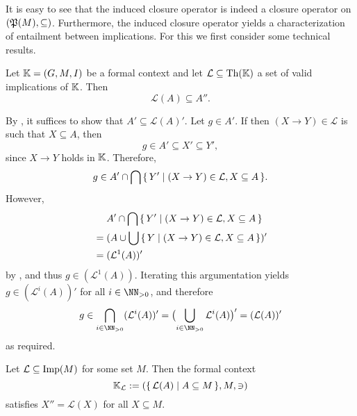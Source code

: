 It is easy to see that the induced closure operator is indeed a closure operator on
$({\mathfrak{P}(M)}, \subseteq)$.  Furthermore, the induced closure operator yields a
characterization of entailment between implications.  For this we first consider some
technical results.

\begin{Proposition}
  \label{prop:sound-implications-do-not-yield-more-then-doubleprime}
  Let ${\mathbb{K}} = (G, M, I)$ be a formal context and let $\mathcal{L} \subseteq \operatorname{Th}({\mathbb{K}})$
  a set of valid implications of ${\mathbb{K}}$.  Then
  \begin{equation*}
    \mathcal{L}(A) \subseteq A''.
  \end{equation*}
\end{Proposition}
\begin{Proof}
  By , it suffices to show that $A' \subseteq
  \mathcal{L}(A)'$.  Let $g \in A'$.  If then $(X \to Y) \in \mathcal{L}$ is such that $X
  \subseteq A$, then
  \begin{equation*}
    g \in A' \subseteq X' \subseteq Y',
  \end{equation*}
  since $X \to Y$ holds in ${\mathbb{K}}$.  Therefore,
  \begin{equation*}
    g \in A' \cap \bigcap {\ensuremath{\{\, Y' \mid (X \to Y) \in \mathcal{L}, X \subseteq A \,\}}}.
  \end{equation*}
  However,
  \begin{align*}
    & \phantom{{}={}} A' \cap \bigcap \set{ Y' \mid (X \to Y) \in \mathcal{L}, X \subseteq A} \\
    & = (A \cup \bigcup \set{ Y \mid (X \to Y) \in \mathcal{L}, X \subseteq A })'\\
    & = (\mathcal{L}^1(A))'
  \end{align*}
  by , and thus $g \in (\mathcal{L}^1(A))$.  Iterating
  this argumentation yields $g \in (\mathcal{L}^i(A))'$ for all $i \in \NN_{>0}$, and
  therefore
  \begin{equation*}
    g \in \bigcap_{i \in \NN_{>0}} (\mathcal{L}^i(A))' = \bigl( \bigcup_{i \in \NN_{>0}}
    \mathcal{L}^i(A) \bigr)' = (\mathcal{L}(A))'
  \end{equation*}
  as required.
\end{Proof}

\begin{Proposition}
  \label{prop:context-model-for-implications}
  Let $\mathcal{L} \subseteq \operatorname{Imp}(M)$ for some set $M$.  Then the formal context
  \begin{equation*}
    {\ensuremath{\mathbb{K}}}_{\mathcal{L}} := ( {\{\, \mathcal{L}(A) \mid A \subseteq M \,\}}, M, \ni )
  \end{equation*}
  satisfies $X'' = \mathcal{L}(X)$ for all $X \subseteq M$.
\end{Proposition}

